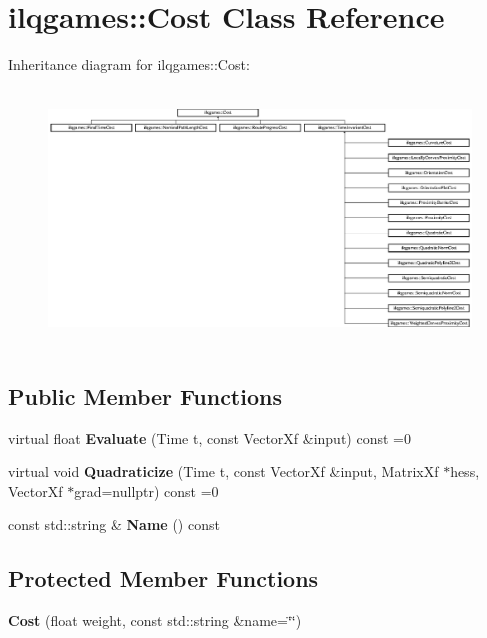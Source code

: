 \hypertarget{classilqgames_1_1_cost}{}\section{ilqgames\+:\+:Cost Class Reference}
\label{classilqgames_1_1_cost}
Inheritance diagram for ilqgames\+:\+:Cost\+:\begin{figure}[H]
\begin{center}
\leavevmode
\includegraphics[height=6.857143cm]{classilqgames_1_1_cost}
\end{center}
\end{figure}
\subsection*{Public Member Functions}
\begin{DoxyCompactItemize}
\item 
virtual float {\bfseries Evaluate} (Time t, const Vector\+Xf \&input) const =0\hypertarget{classilqgames_1_1_cost_a90ad7fc2697f0d8c3392dc5a079e40f9}{}\label{classilqgames_1_1_cost_a90ad7fc2697f0d8c3392dc5a079e40f9}

\item 
virtual void {\bfseries Quadraticize} (Time t, const Vector\+Xf \&input, Matrix\+Xf $\ast$hess, Vector\+Xf $\ast$grad=nullptr) const =0\hypertarget{classilqgames_1_1_cost_ade89b117df8b8ec0e491d121f9682aef}{}\label{classilqgames_1_1_cost_ade89b117df8b8ec0e491d121f9682aef}

\item 
const std\+::string \& {\bfseries Name} () const \hypertarget{classilqgames_1_1_cost_a7e21af3d7f23aee0d913ad5e2e0292cb}{}\label{classilqgames_1_1_cost_a7e21af3d7f23aee0d913ad5e2e0292cb}

\end{DoxyCompactItemize}
\subsection*{Protected Member Functions}
\begin{DoxyCompactItemize}
\item 
{\bfseries Cost} (float weight, const std\+::string \&name=\char`\"{}\char`\"{})\hypertarget{classilqgames_1_1_cost_a9b30ac1d7733741609a3c8d6522a925b}{}\label{classilqgames_1_1_cost_a9b30ac1d7733741609a3c8d6522a925b}

\end{DoxyCompactItemize}
